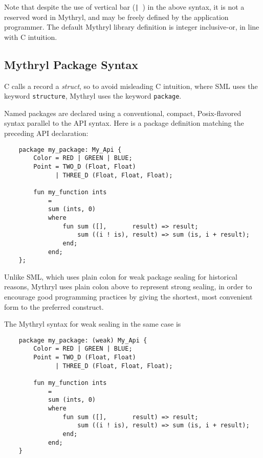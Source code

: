 Note that despite the use of vertical bar ({\tt | }) in the above syntax, it is 
not a reserved word in Mythryl, and may be freely defined by the application 
programmer.  The default Mythryl library definition is integer inclusive-or, 
in line with C intuition.

\cutend*

\subsection{Mythryl Package Syntax}

C calls a record a {\it struct}, so to avoid misleading C intuition,  
where {\sc SML} uses the keyword {\tt structure}, Mythryl uses the keyword {\tt package}.

Named packages are declared using a conventional, compact, Posix-flavored syntax 
parallel to the API syntax.  Here is a package definition matching the preceding 
API declaration:

\begin{verbatim}
    package my_package: My_Api {
        Color = RED | GREEN | BLUE;
        Point = TWO_D (Float, Float)
              | THREE_D (Float, Float, Float);   
        
        fun my_function ints
            =
            sum (ints, 0)
            where
                fun sum ([],       result) => result;
                    sum ((i ! is), result) => sum (is, i + result);
                end;
            end;
    };
\end{verbatim}

Unlike {\sc SML}, which uses plain colon for weak package sealing for 
historical reasons, Mythryl uses plain colon above to represent strong 
sealing, in order to encourage good programming practices by giving the 
shortest, most convenient form to the preferred construct.

The Mythryl syntax for weak sealing in the same case is

\begin{verbatim}
    package my_package: (weak) My_Api {
        Color = RED | GREEN | BLUE;
        Point = TWO_D (Float, Float)
              | THREE_D (Float, Float, Float);   
        
        fun my_function ints
            =
            sum (ints, 0)
            where
                fun sum ([],       result) => result;
                    sum ((i ! is), result) => sum (is, i + result);
                end;
            end;
    }
\end{verbatim}

